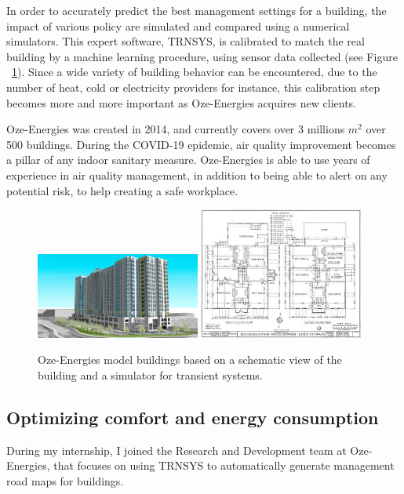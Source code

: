 \documentclass[12pt]{article}
\begin{document}
In order to accurately predict the best management settings for a building, the impact of various policy are simulated and compared using a numerical simulators. This expert software, TRNSYS, is calibrated to match the real building by a machine learning procedure, using sensor data collected (see Figure ~\ref{fig:building_model}). Since a wide variety of building behavior can be encountered, due to the number of heat, cold or electricity providers for instance, this calibration step becomes more and more important as Oze-Energies acquires new clients.

Oze-Energies was created in 2014, and currently covers over 3 millions $m^2$ over 500 buildings. During the COVID-19 epidemic, air quality improvement becomes a pillar of any indoor sanitary measure. Oze-Energies is able to use years of experience in air quality management, in addition to being able to alert on any potential risk, to help creating a safe workplace.

\begin{figure}
    \centering
    \includegraphics[width=0.48\textwidth]{bat.jpg}
    \includegraphics[width=0.48\textwidth]{batschem.jpg}
    \caption{Oze-Energies model buildings based on a schematic view of the building and a simulator for transient systems.}
    \label{fig:building_model}
\end{figure}{}

\subsection{Optimizing comfort and energy consumption}
During my internship, I joined the Research and Development team at Oze-Energies, that focuses on using TRNSYS to automatically generate management road maps for buildings.
\end{document}
